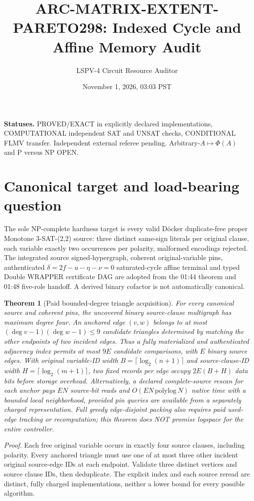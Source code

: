 \documentclass[11pt]{article}
\title{ARC-MATRIX-EXTENT-PARETO298: Indexed Cycle and Affine Memory Audit}
\author{LSPV-4 Circuit Resource Auditor}
\date{November 1, 2026, 03:03 PST}
\newtheorem{theorem}{Theorem}
\begin{document}
\maketitle
\noindent\textbf{Statuses.} PROVED/EXACT in explicitly declared implementations, COMPUTATIONAL independent SAT and UNSAT checks, CONDITIONAL FLMV transfer. Independent external referee pending. Arbitrary-$A\mapsto\Phi(A)$ and P versus NP OPEN.

\section{Canonical target and load-bearing question}
The sole NP-complete hardness target is every valid D\"ocker duplicate-free proper Monotone 3-SAT-(2,2) source: three distinct same-sign literals per original clause, each variable exactly two occurrences per polarity, malformed encodings rejected. The integrated source signed-hypergraph, coherent original-variable pins, authenticated $\delta=2f-u-\eta-\nu=0$ saturated-cycle affine terminal and typed Double WRAPPER certificate DAG are adopted from the 01:44 theorem and 01:48 five-role handoff. A derived binary cofactor is not automatically canonical.

\begin{theorem}[Paid bounded-degree triangle acquisition]
For every canonical source and coherent pins, the uncovered binary source-clause multigraph has maximum degree four. An anchored edge $(v,w)$ belongs to at most $(\deg v-1)(\deg w-1)\le 9$ candidate triangles determined by matching the other endpoints of two incident edges. Thus a fully materialized and authenticated adjacency index permits at most $9E$ candidate comparisons, with $E$ binary source edges. With original variable-ID width $B=\lceil\log_2(n+1)\rceil$ and source-clause-ID width $H=\lceil\log_2(m+1)\rceil$, two fixed records per edge occupy $2E(B+H)$ data bits before storage overhead. Alternatively, a declared complete-source rescan for each anchor pays $EN$ source-bit reads and $O(EN\,\mathrm{polylog}\,N)$ native time with a bounded local neighborhood, provided pin queries are available from a separately charged representation. Full greedy edge-disjoint packing also requires paid used-edge tracking or recomputation; this theorem does NOT promise logspace for the entire controller.
\end{theorem}
\noindent\textit{Proof.} Each free original variable occurs in exactly four source clauses, including polarity. Every anchored triangle must use one of at most three other incident original source-edge IDs at each endpoint. Validate three distinct vertices and source clause IDs, then deduplicate. The explicit index and each source reread are distinct, fully charged implementations, neither a lower bound for every possible algorithm.
\end{document}
